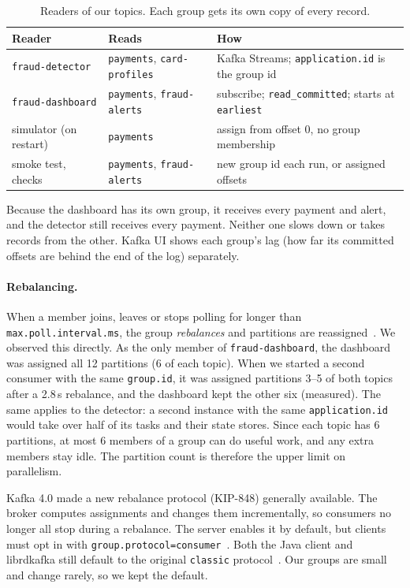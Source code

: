 \begin{table}[h]
\centering
\small
\begin{tabular}{@{}lll@{}}
\toprule
Reader & Reads & How \\
\midrule
\texttt{fraud-detector} & \texttt{payments}, \texttt{card-profiles} & Kafka Streams; \texttt{application.id} is the group id~\cite{kafka-streams-configs} \\
\texttt{fraud-dashboard} & \texttt{payments}, \texttt{fraud-alerts} & subscribe; \texttt{read\_committed}; starts at \texttt{earliest} \\
simulator (on restart) & \texttt{payments} & assign from offset 0, no group membership \\
smoke test, checks & \texttt{payments}, \texttt{fraud-alerts} & new group id each run, or assigned offsets \\
\bottomrule
\end{tabular}
\caption{Readers of our topics. Each group gets its own copy of every record.}
\label{tab:groups}
\end{table}

Because the dashboard has its own group, it receives every payment and alert, and the detector still receives every payment. Neither one slows down or takes records from the other. Kafka UI shows each group's lag (how far its committed offsets are behind the end of the log) separately.

\paragraph{Rebalancing.}
When a member joins, leaves or stops polling for longer than \texttt{max.poll.interval.ms}, the group \emph{rebalances} and partitions are reassigned~\cite{librdkafka-config}. We observed this directly. As the only member of \texttt{fraud-dashboard}, the dashboard was assigned all 12 partitions (6 of each topic). When we started a second consumer with the same \texttt{group.id}, it was assigned partitions 3--5 of both topics after a 2.8\,s rebalance, and the dashboard kept the other six (measured). The same applies to the detector: a second instance with the same \texttt{application.id} would take over half of its tasks and their state stores. Since each topic has 6 partitions, at most 6 members of a group can do useful work, and any extra members stay idle. The partition count is therefore the upper limit on parallelism.

Kafka 4.0 made a new rebalance protocol (KIP-848) generally available. The broker computes assignments and changes them incrementally, so consumers no longer all stop during a rebalance. The server enables it by default, but clients must opt in with \texttt{group.protocol=consumer}~\cite{kafka-40-release}. Both the Java client and librdkafka still default to the original \texttt{classic} protocol~\cite{kafka-consumer-configs, librdkafka-config}. Our groups are small and change rarely, so we kept the default.
